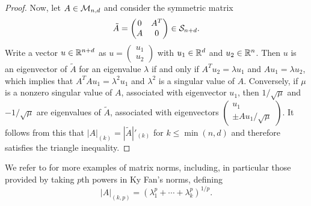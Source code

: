 \begin{proof}
Now, let $A\in {\mathcal M}_{n,d}$ and consider the symmetric matrix
\[
\tilde A = \begin{pmatrix}
0 & A^T\\ A & 0
\end{pmatrix}
\in {\mathcal S}_{n+d}.
\]
Write a vector $u \in {\mathbb{R}}^{n+d}$ as $u = \begin{pmatrix}
u_1\\u_2
\end{pmatrix}
$ with $u_1\in {\mathbb{R}}^d$ and $u_2\in {\mathbb{R}}^n$. Then $u$ is an eigenvector of $\tilde A$ for an eigenvalue $\lambda$ if and only if $A^Tu_2 =\lambda u_1$ and $Au_1 = \lambda u_2$, which implies that $A^TA u_1 = \lambda^2 u_1$ and $\lambda^2 $ is a singular value of $A$.  Conversely, if $\mu$ is a nonzero singular value of $A$, associated with eigenvector $u_1$, then $1 /\sqrt{\mu}$ and $-1 /\sqrt{\mu}$ are eigenvalues of $\tilde A$, associated with eigenvectors $\begin{pmatrix}
u_1 \\ \pm  Au_1 / \sqrt{\mu}
\end{pmatrix} 
$.
It follows from this that $|A|_{(k)} = |\tilde A|'_{(k)}$ for $k \leq \min(n,d)$ and therefore satisfies the triangle inequality. 
\end{proof}

We refer to \cite{bhatia2013matrix} for more examples of matrix norms, including, in particular those provided by taking $p$th powers in Ky Fan's norms, defining
\[
|A|_{(k,p)} = (\lambda_1^p + \cdots + \lambda_k^p)^{1/p}.
\]





